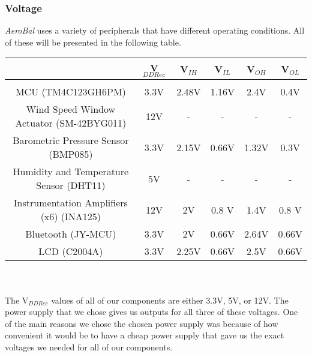 		\subsubsection{Voltage}

			\textit{AeroBal} uses a variety of peripherals that have different operating conditions. All of these will be presented in the following table. \\





			\begin{tabular}{|c|c|c|c|c|c|}
				\hline
					& V$_{DD Rec}$ & V$_{IH}$ & V$_{IL}$ & V$_{OH}$ & V$_{OL}$ \\
				\hline
					& & & & &  \\
					MCU (TM4C123GH6PM) & 3.3V & 2.48V & 1.16V & 2.4V & 0.4V \\
					Wind Speed Window Actuator (SM-42BYG011) & 12V & - & - & - & - \\
					Barometric Pressure Sensor (BMP085) & 3.3V & 2.15V & 0.66V & 1.32V & 0.3V \\
					Humidity and Temperature Sensor (DHT11)& 5V & - & - & - & - \\
					Instrumentation Amplifiers (x6) (INA125) & 12V & 2V & 0.8 V & 1.4V & 0.8 V\\
					Bluetooth (JY-MCU) & 3.3V & 2V & 0.66V  & 2.64V & 0.66V \\
					LCD (C2004A) & 3.3V & 2.25V & 0.66V & 2.5V & 0.66V \\
				\hline
			\end{tabular} \\ \\

			The V$_{DD Rec}$ values of all of our components are either 3.3V, 5V, or 12V. The power supply that we chose gives us outputs for all three of these voltages. One of the main reasons we chose the chosen power supply was because of how convenient it would be to have a cheap power supply that gave us the exact voltages we needed for all of our components. \\

